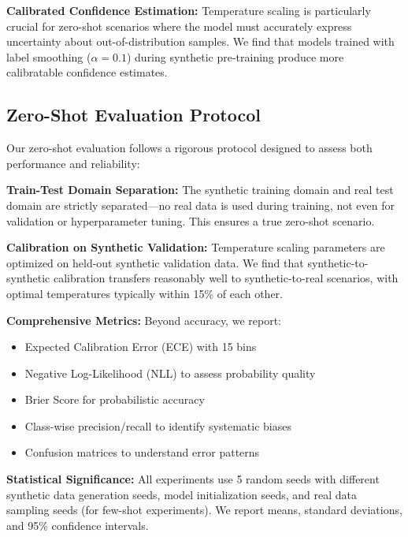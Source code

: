\documentclass[journal]{IEEEtran}
\begin{document}
\textbf{Calibrated Confidence Estimation:} Temperature scaling is particularly crucial for zero-shot scenarios where the model must accurately express uncertainty about out-of-distribution samples. We find that models trained with label smoothing ($\alpha = 0.1$) during synthetic pre-training produce more calibratable confidence estimates.

\subsection{Zero-Shot Evaluation Protocol}
Our zero-shot evaluation follows a rigorous protocol designed to assess both performance and reliability:

\textbf{Train-Test Domain Separation:} The synthetic training domain and real test domain are strictly separated—no real data is used during training, not even for validation or hyperparameter tuning. This ensures a true zero-shot scenario.

\textbf{Calibration on Synthetic Validation:} Temperature scaling parameters are optimized on held-out synthetic validation data. We find that synthetic-to-synthetic calibration transfers reasonably well to synthetic-to-real scenarios, with optimal temperatures typically within 15\% of each other.

\textbf{Comprehensive Metrics:} Beyond accuracy, we report:
\begin{itemize}
\item Expected Calibration Error (ECE) with 15 bins
\item Negative Log-Likelihood (NLL) to assess probability quality
\item Brier Score for probabilistic accuracy
\item Class-wise precision/recall to identify systematic biases
\item Confusion matrices to understand error patterns
\end{itemize}

\textbf{Statistical Significance:} All experiments use 5 random seeds with different synthetic data generation seeds, model initialization seeds, and real data sampling seeds (for few-shot experiments). We report means, standard deviations, and 95\% confidence intervals.
\end{document}
